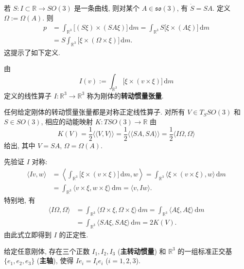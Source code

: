 若 $S:I\subset\mathbb{R}\to SO(3)$ 是一条曲线, 则对某个 $A\in\mathfrak{so}(3)$, 有 $\dot S=SA$. 定义 $\Omega:=\Omega(A)$. 则
\begin{align*}
  p&=\int_{\mathbb{R}^3}\bigl[(S\xi)\times(SA\xi)\bigr]\,\mathrm{d}m
    =\int_{\mathbb{R}^3}S\bigl[\xi\times(A\xi)\bigr]\,\mathrm{d}m\\
   &=S\int_{\mathbb{R}^3}\bigl[\xi\times(\Omega\times\xi)\bigr]\,\mathrm{d}m.
\end{align*}
这提示了如下定义.

\begin{RiemannDefinition}\label{def:moment-of-inertia-tensor}
由
\[
  I(v):=\int_{\mathbb{R}^3}\bigl[\xi\times(v\times\xi)\bigr]\,\mathrm{d}m
\]
定义的线性算子 $I:\mathbb{R}^3\to\mathbb{R}^3$ 称为刚体的\textbf{转动惯量张量}.
\end{RiemannDefinition}

\begin{RiemannProposition}\label{prop:kinetic-energy-via-inertia-tensor}
任何给定刚体的转动惯量张量都是对称正定线性算子. 对所有 $V\in T_SSO(3)$ 和 $S\in SO(3)$, 相应的动能映射 $K:TSO(3)\to\mathbb{R}$ 由
\[
  K(V)=\frac12\langle\!\langle V,V\rangle\!\rangle
  =\frac12\langle\!\langle SA,SA\rangle\!\rangle
  =\frac12\langle I\Omega,\Omega\rangle
\]
给出, 其中 $V=SA$, $\Omega=\Omega(A)$.
\end{RiemannProposition}

\begin{RiemannProof}
先验证 $I$ 对称:
\begin{align*}
  \langle Iv,w\rangle
  &=\left\langle\int_{\mathbb{R}^3}\bigl[\xi\times(v\times\xi)\bigr]\,\mathrm{d}m,w\right\rangle
    =\int_{\mathbb{R}^3}\langle\xi\times(v\times\xi),w\rangle\,\mathrm{d}m\\
  &=\int_{\mathbb{R}^3}\langle v\times\xi,w\times\xi\rangle\,\mathrm{d}m
    =\langle v,Iw\rangle.
\end{align*}
特别地, 有
\begin{align*}
  \langle I\Omega,\Omega\rangle
  &=\int_{\mathbb{R}^3}\langle\Omega\times\xi,\Omega\times\xi\rangle\,\mathrm{d}m
    =\int_{\mathbb{R}^3}\langle A\xi,A\xi\rangle\,\mathrm{d}m\\
  &=\int_{\mathbb{R}^3}\langle SA\xi,SA\xi\rangle\,\mathrm{d}m=2K(V).
\end{align*}
由此式立即得到 $I$ 的正定性.
\end{RiemannProof}

\begin{RiemannCorollary}\label{cor:existence-of-principal-moments-and-axes}
给定任意刚体, 存在三个正数 $I_1,I_2,I_3$ (\textbf{主转动惯量}) 和 $\mathbb{R}^3$ 的一组标准正交基 $\{e_1,e_2,e_3\}$ (\textbf{主轴}), 使得 $Ie_i=I_ie_i$ ($i=1,2,3$).
\end{RiemannCorollary}

